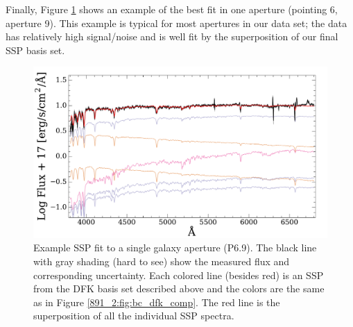 


Finally, Figure \ref{891_2:fig:ex_fit} shows an example of the best
fit in one aperture (pointing 6, aperture 9). This example is typical
for most apertures in our data set; the data has relatively high
signal/noise and is well fit by the superposition of our final SSP
basis set.


\begin{figure}
  \centering
  \includegraphics[width=\columnwidth]{891_2/figs/example_fit.pdf}
  \caption[Example model galaxy
    fit]{\fixspacing\label{891_2:fig:ex_fit}Example SSP fit to a
    single galaxy aperture (P6.9). The black line with gray shading
    (hard to see) show the measured flux and corresponding
    uncertainty. Each colored line (besides red) is an SSP from the
     DFK basis set described above and the
    colors are the same as in Figure \ref{891_2:fig:bc_dfk_comp}. The
    red line is the superposition of all the individual SSP spectra.}
\end{figure}
